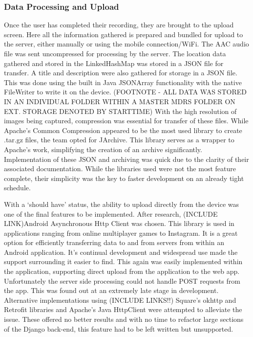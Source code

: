 \documentclass{l3proj}
\begin{document}
\subsubsection {Data Processing and Upload}
Once the user has completed their recording, they are brought to the upload screen. Here all the information gathered is prepared and bundled for upload to the server, either manually or using the mobile connection/WiFi. The AAC audio file was sent uncompressed for processing by the server. The location data gathered and stored in the LinkedHashMap was stored in a JSON file for transfer. A title and description were also gathered for storage in a JSON file. This was done using the built in Java JSONArray functionality with the native FileWriter to write it on the device.
(FOOTNOTE - ALL DATA WAS STORED IN AN INDIVIDUAL FOLDER WITHIN A MASTER MDRS FOLDER ON EXT. STORAGE DENOTED BY STARTTIME)
With the high resolution of images being captured, compression was essential for transfer of these files. While Apache’s Common Compression appeared to be the most used library to create .tar.gz files, the team opted for JArchive. This library serves as a wrapper to Apache’s work, simplifying the creation of an archive significantly. Implementation of these JSON and archiving was quick due to the clarity of their associated documentation. While the libraries used were not the most feature complete, their simplicity was the key to faster development on an already tight schedule.

With a ‘should have’ status, the ability to upload directly from the device was one of the final features to be implemented. After research, (INCLUDE LINK)Android Asynchronous Http Client was chosen. This library is used in applications ranging from online multiplayer games to Instagram. It is a great option for efficiently transferring data to and from servers from within an Android application. It's continual development and widespread use made the support surrounding it easier to find. This again was easily implemented within the application, supporting direct upload from the application to the web app. Unfortunately the server side processing could not handle POST requests from the app. This was found out at an extremely late stage in development. Alternative implementations using (INCLUDE LINKS!!) Square's okhttp and Retrofit libraries and Apache’s Java HttpClient were attempted to alleviate the issue. These offered no better results and with no time to refactor large sections of the Django back-end, this feature had to be left written but unsupported.
\end{document}
